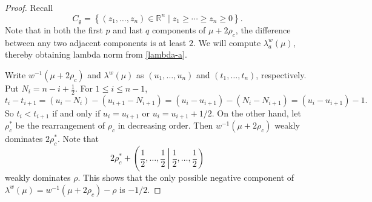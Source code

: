 \documentclass[11pt]{amsart}
\theoremstyle{plain}
\theoremstyle{definition}
\newcommand{\mfg}{\mathfrak{g}}
\newcommand{\bbR}{\mathbb{R}}
\begin{document}
\begin{proof}
 Recall
	\[C_\mfg=\left\{(z_1,\dots,z_n)\in\bbR^n\mid z_1\ge\cdots\ge z_n\ge 0\right\}.\]
Note that in both the first $p$ and last $q$ components of
$\mu+2\rho_c$, the difference between any two adjacent components is at least $2$. We will compute $\lambda_a^w(\mu)$, thereby obtaining lambda norm from \eqref{lambda-a}.

	Write $w^{-1}(\mu+2\rho_c)$ and $\lambda^w(\mu)$ as $(u_1,\dots,u_n)$ and $(t_1,\dots,t_n)$, respectively. Put $N_i=n-i+\frac{1}{2}$. For $1\le i\le n-1$,
	\[t_i-t_{i+1}=(u_i-N_i)-(u_{i+1}-N_{i+1})=(u_i-u_{i+1})-(N_i-N_{i+1})=(u_i-u_{i+1})-1.\]
	So $t_i< t_{i+1}$ if and only if $u_i=u_{i+1}$ or $u_i=u_{i+1}+1/2$. On the other hand, let $\rho_c^*$ be the rearrangement of $\rho_c$ in decreasing order. Then $w^{-1}(\mu+2\rho_c)$ weakly dominates $2\rho_c^*$. Note that
$$
2\rho_c^*+\left(\frac{1}{2},\dots,\frac{1}{2}\ \left|\ \frac{1}{2},\dots,\frac{1}{2}\right)\right.
$$ weakly dominates $\rho$. This shows that the only possible negative component of $\lambda^w(\mu)=w^{-1}(\mu+2\rho_c)-\rho$ is $-1/2$.
	

\end{proof}
\end{document}
